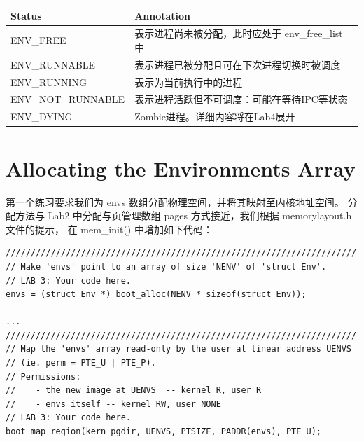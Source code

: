 \documentclass[12pt, letterpaper]{report}
\begin{document}
\begin{tabular}{|l|l|}
    \hline  
    \textbf{Status}&\textbf{Annotation}\\
    \hline 
    ENV\_FREE&表示进程尚未被分配，此时应处于 env\_free\_list 中\\
    \hline 
    ENV\_RUNNABLE&表示进程已被分配且可在下次进程切换时被调度\\
    \hline 
    ENV\_RUNNING&表示为当前执行中的进程\\
    \hline 
    ENV\_NOT\_RUNNABLE&表示进程活跃但不可调度：可能在等待IPC等状态\\
    \hline 
    ENV\_DYING&Zombie进程。详细内容将在Lab4展开\\
    \hline 
\end{tabular}


\section[\large Allocating the Environments Array]{Allocating the Environments Array}

\quad \par 
第一个练习要求我们为 envs 数组分配物理空间，并将其映射至内核地址空间。
分配方法与 Lab2 中分配与页管理数组 pages 方式接近，我们根据 memorylayout.h 文件的提示，
在 mem\_init() 中增加如下代码：\par 
\lstset{style=CStyle}
\setmainfont{Consolas}
\begin{lstlisting}
//////////////////////////////////////////////////////////////////////
// Make 'envs' point to an array of size 'NENV' of 'struct Env'.
// LAB 3: Your code here.
envs = (struct Env *) boot_alloc(NENV * sizeof(struct Env));

...
//////////////////////////////////////////////////////////////////////
// Map the 'envs' array read-only by the user at linear address UENVS
// (ie. perm = PTE_U | PTE_P).
// Permissions:
//    - the new image at UENVS  -- kernel R, user R
//    - envs itself -- kernel RW, user NONE
// LAB 3: Your code here.
boot_map_region(kern_pgdir, UENVS, PTSIZE, PADDR(envs), PTE_U);
\end{lstlisting}
\setmainfont{Times New Roman}
\end{document}
